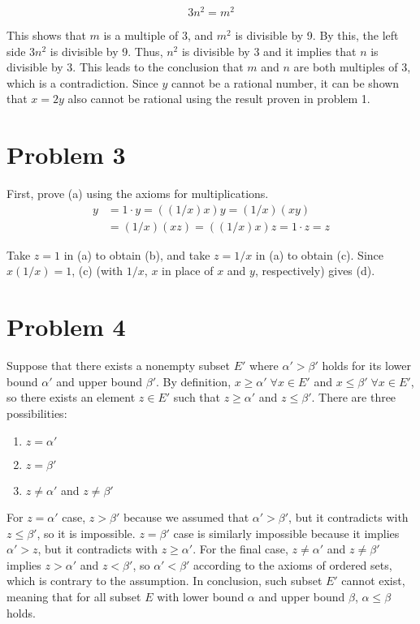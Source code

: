 \documentclass{scrartcl}
\begin{document}
\[
  3n^2 = m^2
\]

This shows that \(m\) is a multiple of 3, and \(m^2\) is divisible by 9. By this, the left side \(3n^2\) is divisible by 9. Thus, \(n^2\) is divisible by 3 and it implies that \(n\) is divisible by 3. This leads to the conclusion that \(m\) and \(n\) are both multiples of 3, which is a contradiction. Since \(y\) cannot be a rational number, it can be shown that \(x = 2y\) also cannot be rational using the result proven in problem 1.

\section{Problem 3}
First, prove (a) using the axioms for multiplications.
\begin{align*}
  y &= 1 \cdot y = ((1 / x) x) y = (1 / x) (xy) \\
    &= (1 / x) (xz) = ((1 / x) x) z = 1 \cdot z = z
\end{align*}

Take \(z = 1\) in (a) to obtain (b), and take \(z = 1 / x\) in (a) to obtain (c). Since \(x (1 / x) = 1\), (c) (with \(1 / x\), \(x\) in place of \(x\) and \(y\), respectively) gives (d).

\section{Problem 4}
Suppose that there exists a nonempty subset \(E'\) where \(\alpha' > \beta'\) holds for its lower bound \(\alpha'\) and upper bound \(\beta'\). By definition, \(x \geq \alpha' \; \forall x \in E'\) and \(x \leq \beta' \; \forall x \in E'\), so there exists an element \(z \in E'\) such that \(z \geq \alpha'\) and \(z \leq \beta'\). There are three possibilities:

\begin{enumerate}
  \item \(z = \alpha'\)
  \item \(z = \beta'\)
  \item \(z \not = \alpha'\) and \(z \not = \beta'\)
\end{enumerate}

For \(z = \alpha'\) case, \(z > \beta'\) because we assumed that \(\alpha' > \beta'\), but it contradicts with \(z \leq \beta'\), so it is impossible. \(z = \beta'\) case is similarly impossible because it implies \(\alpha' > z\), but it contradicts with \(z \geq \alpha'\). For the final case, \(z \not = \alpha'\) and \(z \not = \beta'\) implies \(z > \alpha'\) and \(z < \beta'\), so \(\alpha' < \beta'\) according to the axioms of ordered sets, which is contrary to the assumption. In conclusion, such subset \(E'\) cannot exist, meaning that for all subset \(E\) with lower bound \(\alpha\) and upper bound \(\beta\), \(\alpha \leq \beta\) holds.
\end{document}
